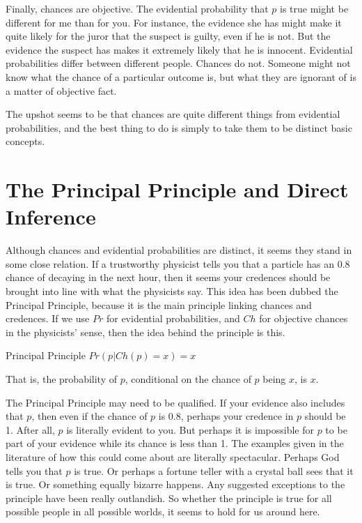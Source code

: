 Finally, chances are objective. The evidential probability that $p$ is true might be different for me than for you. For instance, the evidence she has might make it quite likely for the juror that the suspect is guilty, even if he is not. But the evidence the suspect has makes it extremely likely that he is innocent. Evidential probabilities differ between different people. Chances do not. Someone might not know what the chance of a particular outcome is, but what they are ignorant of is a matter of objective fact.

The upshot seems to be that chances are quite different things from evidential probabilities, and the best thing to do is simply to take them to be distinct basic concepts.

\section{The Principal Principle and Direct Inference}
Although chances and evidential probabilities are distinct, it seems they stand in some close relation. If a trustworthy physicist tells you that a particle has an 0.8 chance of decaying in the next hour, then it seems your credences should be brought into line with what the physicists say. This idea has been dubbed the Principal Principle, because it is the main principle linking chances and credences. If we use $Pr$ for evidential probabilities, and $Ch$ for objective chances in the physicists' sense, then the idea behind the principle is this.

\begin{description*}
\item[Principal Principle] $Pr(p | Ch(p) = x) = x$
\end{description*}
\noindent That is, the probability of $p$, conditional on the chance of $p$ being $x$, is $x$.

The Principal Principle may need to be qualified. If your evidence also includes that $p$, then even if the chance of $p$ is 0.8, perhaps your credence in $p$ should be 1. After all, $p$ is literally evident to you. But perhaps it is impossible for $p$ to be part of your evidence while its chance is less than 1. The examples given in the literature of how this could come about are literally spectacular. Perhaps God tells you that $p$ is true. Or perhaps a fortune teller with a crystal ball sees that it is true. Or something equally bizarre happens. Any suggested exceptions to the principle have been really outlandish. So whether the principle is true for all possible people in all possible worlds, it seems to hold for us around here.

